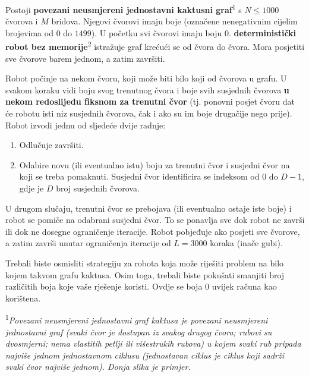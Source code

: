 \documentclass[12pt]{article}
\begin{document}
\renewcommand{\round}{Dan 2}
\renewcommand{\problemName}{Task Navigiranje}
\renewcommand{\lang}{Hrvatski}

\renewcommand{\tl}{$3$ sek.}
\renewcommand{\ml}{$512$ MB}
\problem{\problemName}

Postoji \textbf{povezani neusmjereni jednostavni kaktusni graf}\textsuperscript{1} s $N \leq 1000$ čvorova i $M$ bridova. Njegovi čvorovi imaju boje (označene nenegativnim cijelim brojevima od $0$ do $1499$). U početku svi čvorovi imaju boju $0$. \textbf{deterministički robot bez memorije}\textsuperscript{2} istražuje graf krećući se od čvora do čvora. Mora posjetiti sve čvorove barem jednom, a zatim završiti.

Robot počinje na nekom čvoru, koji može biti bilo koji od čvorova u grafu. U svakom koraku vidi boju svog trenutnog čvora i boje svih susjednih čvorova \textbf{u nekom redoslijedu fiksnom za trenutni čvor} (tj. ponovni posjet čvoru dat će robotu isti niz susjednih čvorova, čak i ako su im boje drugačije nego prije). Robot izvodi jednu od sljedeće dvije radnje:
\begin{enumerate}
\item Odlučuje završiti.
\item Odabire novu (ili eventualno istu) boju za trenutni čvor i susjedni čvor na koji se treba pomaknuti. Susjedni čvor identificira se indeksom od $0$ do $D-1$, gdje je $D$ broj susjednih čvorova.
\end{enumerate}

U drugom slučaju, trenutni čvor se prebojava (ili eventualno ostaje iste boje) i robot se pomiče na odabrani susjedni čvor. To se ponavlja sve dok robot ne završi ili dok ne dosegne ograničenje iteracije. Robot pobjeđuje ako posjeti sve čvorove, a zatim završi unutar ograničenja iteracije od $L = 3000$ koraka (inače gubi).

Trebali biste osmisliti strategiju za robota koja može riješiti problem na bilo kojem takvom grafu kaktusa. Osim toga, trebali biste pokušati smanjiti broj različitih boja koje vaše rješenje koristi. Ovdje se boja 0 uvijek računa kao korištena.

\textsuperscript{1}\textit{Povezani neusmjereni jednostavni graf kaktusa je povezani neusmjereni jednostavni graf (svaki čvor je dostupan iz svakog drugog čvora; rubovi su dvosmjerni; nema vlastitih petlji ili višestrukih rubova) u kojem svaki rub pripada najviše jednom jednostavnom ciklusu (jednostavan ciklus je ciklus koji sadrži svaki čvor najviše jednom). Donja slika je primjer.}
\end{document}
